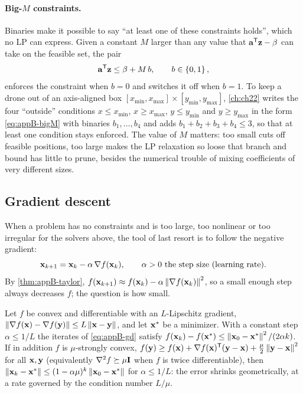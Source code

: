 \paragraph{Big-$M$ constraints.}
Binaries make it possible to say ``at least one of these constraints holds'',
which no LP can express. Given a constant $M$ larger than any value that
$\mathbf{a}^{\mathsf{T}}\mathbf{z} - \beta$ can take on the feasible set, the pair
\begin{equation}
  \mathbf{a}^{\mathsf{T}}\mathbf{z} \le \beta + M\,b,\qquad b \in \left\{ 0, 1 \right\},
  \label{eq:appB-bigM}
\end{equation}
enforces the constraint when $b = 0$ and switches it off when $b =
1$. To keep a drone out of an axis-aligned box
$[x_{\min}, x_{\max}] \times [y_{\min}, y_{\max}]$, \cref{ch:ch22} writes the
four ``outside'' conditions $x \le x_{\min}$, $x \ge x_{\max}$, $y \le
y_{\min}$ and $y \ge y_{\max}$ in the form \cref{eq:appB-bigM} with binaries
$b_1, \dots, b_4$ and adds $b_1 + b_2 + b_3 + b_4 \le 3$, so that at least one
condition stays enforced. The value of $M$ matters: too small cuts off
feasible positions, too large makes the LP relaxation so loose that branch and
bound has little to prune, besides the numerical trouble of mixing
coefficients of very different sizes.

\subsection{Gradient descent}
\label{sec:appB-gd}

When a problem has no constraints and is too large, too nonlinear or too
irregular for the solvers above, the tool of last resort is to follow the
negative gradient:
\begin{equation}
  \mathbf{x}_{k+1} = \mathbf{x}_k - \alpha\,\nabla f(\mathbf{x}_k),\qquad \alpha > 0 \text{ the step size (learning rate)}.
  \label{eq:appB-gd}
\end{equation}
By \cref{thm:appB-taylor}, $f(\mathbf{x}_{k+1}) \approx f(\mathbf{x}_k) -
\alpha\left\lVert \nabla f(\mathbf{x}_k) \right\rVert^2$, so a small enough step always decreases
$f$; the question is how small.

\begin{proposition}
\label{thm:appB-gd}
Let $f$ be convex and differentiable with an $L$-Lipschitz gradient, $\left\lVert \nabla f(\mathbf{x}) - \nabla f(\mathbf{y}) \right\rVert \le L\left\lVert \mathbf{x} - \mathbf{y} \right\rVert$, and let $\mathbf{x}^*$ be a minimizer. With a constant step $\alpha \le 1/L$ the iterates of \cref{eq:appB-gd} satisfy $f(\mathbf{x}_k) - f(\mathbf{x}^*) \le \left\lVert \mathbf{x}_0 - \mathbf{x}^* \right\rVert^2/(2\alpha k)$. If in addition $f$ is $\mu$-strongly convex, $f(\mathbf{y}) \ge f(\mathbf{x}) + \nabla f(\mathbf{x})^{\mathsf{T}}(\mathbf{y} - \mathbf{x}) + \tfrac{\mu}{2}\left\lVert \mathbf{y} - \mathbf{x} \right\rVert^2$ for all $\mathbf{x}, \mathbf{y}$ (equivalently $\nabla^2 f \succeq \mu\mathbf{I}$ when $f$ is twice differentiable), then $\left\lVert \mathbf{x}_k - \mathbf{x}^* \right\rVert \le (1 - \alpha\mu)^{k}\left\lVert \mathbf{x}_0 - \mathbf{x}^* \right\rVert$ for $\alpha \le 1/L$: the error shrinks geometrically, at a rate governed by the condition number $L/\mu$.
\end{proposition}

